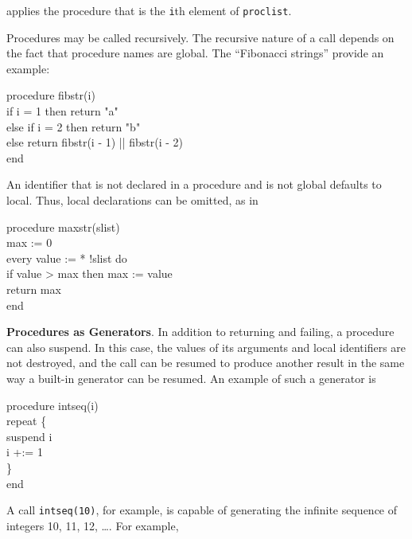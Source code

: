 
\noindent
applies the procedure that is the \texttt{i}th element of \texttt{proclist}.

Procedures may be called recursively. The recursive nature of a call
depends on the fact that procedure names are global. The
``Fibonacci strings'' provide an example:

\begin{iconcode}
\>procedure fibstr(i)\\
\>\>if i = 1 then return "a"\\
\>\>else if i = 2 then return "b"\\
\>\>else return fibstr(i - 1) || fibstr(i - 2)\\
\>end
\end{iconcode}

An identifier that is not declared in a procedure and is not global
defaults to local. Thus, local declarations can be omitted, as in

\begin{iconcode}
\>procedure maxstr(slist)\\
\>\>max := 0\\
\>\>every value := * !slist do\\
\>\>\>if value > max then max := value\\
\>\>return max\\
\>end
\end{iconcode}

\textbf{Procedures as Generators}. In addition to returning and
failing, a procedure can also suspend. In this case, the values of its
arguments and local identifiers are not destroyed, and the call can
be resumed to produce another result in the same way a built-in
generator can be resumed. An example of such a generator is

\begin{iconcode}
\>procedure intseq(i)\\
\>\>repeat \{\\
\>\>\>suspend i\\
\>\>\>i +:= 1\\
\>\>\>\}\\
\>end
\end{iconcode}

A call \texttt{intseq(10)}, for example, is capable of generating the
infinite sequence of integers 10, 11, 12, \ldots .  For example,

